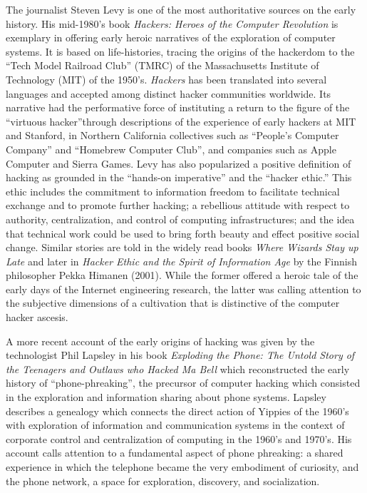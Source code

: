 \documentclass[10pt,letter,oneside]{scrartcl}
\begin{document}
The journalist Steven Levy is one of the most authoritative sources on the early
history. His mid-1980's book \emph{Hackers: Heroes of the Computer
  Revolution} \parencite{levy_hackers:_1984} is exemplary in offering early
heroic narratives of the exploration of computer systems. It is based on
life-histories, tracing the origins of the hackerdom to the ``Tech Model
Railroad Club'' (TMRC) of the Massachusetts Institute of Technology (MIT) of the
1950's. \emph{Hackers} has been translated into several languages and accepted
among distinct hacker communities worldwide.  Its narrative had the performative
force of instituting a return to the figure of the ``virtuous hacker''through
descriptions of the experience of early hackers at MIT and Stanford, in Northern
California collectives such as ``People's Computer Company'' and ``Homebrew
Computer Club'', and companies such as Apple Computer and Sierra Games.  Levy
has also popularized a positive definition of hacking as grounded in the
``hands-on imperative'' and the ``hacker ethic.''  This ethic includes the
commitment to information freedom to facilitate technical exchange and to
promote further hacking; a rebellious attitude with respect to authority,
centralization, and control of computing infrastructures; and the idea that
technical work could be used to bring forth beauty and effect positive social
change.  Similar stories are told in the widely read books \emph{Where Wizards
  Stay up Late} \parencite{hafner1998wizards} and later in \emph{Hacker Ethic
  and the Spirit of Information Age} by the Finnish philosopher Pekka Himanen
(2001). While the former offered a heroic tale of the early days of the Internet
engineering research, the latter was calling attention to the subjective
dimensions of a cultivation that is distinctive of the computer hacker ascesis.

A more recent account of the early origins of hacking was given by the
technologist Phil Lapsley \cite*{lapsley_exploding_2013} in his book
\emph{Exploding the Phone: The Untold Story of the Teenagers and Outlaws who
  Hacked Ma Bell} which reconstructed the early history of ``phone-phreaking'',
the precursor of computer hacking which consisted in the exploration and
information sharing about phone systems.  Lapsley describes a genealogy which
connects the direct action of Yippies of the 1960's with exploration of
information and communication systems in the context of corporate control and
centralization of computing in the 1960's and 1970's.  His account calls
attention to a fundamental aspect of phone phreaking: a shared experience in
which the telephone became the very embodiment of curiosity, and the phone
network, a space for exploration, discovery, and socialization.
\end{document}
